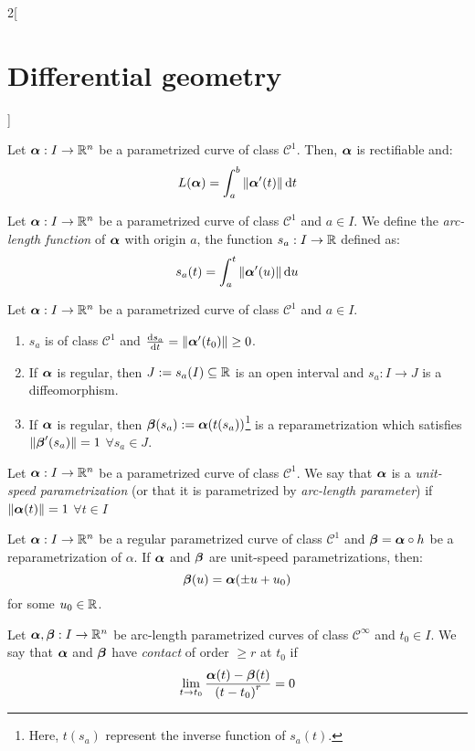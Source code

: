 \documentclass[../../../main.tex]{subfiles}
\begin{document}
\begin{multicols}{2}[\section{Differential geometry}]
\begin{definition}
  \end{definition}
  \begin{proposition}
    Let $\boldsymbol{\mathrm{\alpha}}:I\rightarrow\mathbb{R}^n$ be a parametrized curve of class $\mathcal{C}^1$. Then, $\boldsymbol{\mathrm{\alpha}}$ is rectifiable and: $$L(\boldsymbol{\mathrm{\alpha}})=\int_a^b\|\boldsymbol{\mathrm{\alpha}}'(t)\|\dd{t}$$
  \end{proposition}
  \begin{definition}
    Let $\boldsymbol{\mathrm{\alpha}}:I\rightarrow\mathbb{R}^n$ be a parametrized curve of class $\mathcal{C}^1$ and $a\in I$. We define the \emph{arc-length function} of $\boldsymbol{\mathrm{\alpha}}$ with origin $a$, the function $s_a:I\rightarrow\mathbb{R}$ defined as: $$s_a(t)=\int_a^t\|\boldsymbol{\mathrm{\alpha}}'(u)\|\dd{u}$$
  \end{definition}
  \begin{proposition}
    Let $\boldsymbol{\mathrm{\alpha}}:I\rightarrow\mathbb{R}^n$ be a parametrized curve of class $\mathcal{C}^1$ and $a\in I$.
    \begin{enumerate}
      \item $s_a$ is of class $\mathcal{C}^1$ and $\dv{s_a}{t}(t_0)=\|\boldsymbol{\mathrm{\alpha}}'(t_0)\|\geq 0$.
      \item If $\boldsymbol{\mathrm{\alpha}}$ is regular, then $J:=s_a(I)\subseteq\mathbb{R}$ is an open interval and $s_a:I\rightarrow J$ is a diffeomorphism.
      \item If $\boldsymbol{\mathrm{\alpha}}$ is regular, then $\boldsymbol{\mathrm{\beta}}(s_a):=\boldsymbol{\mathrm{\alpha}}(t(s_a))$\footnote{Here, $t(s_a)$ represent the inverse function of $s_a(t)$.} is a reparametrization which satisfies $\|\boldsymbol{\mathrm{\beta}}'(s_a)\|=1$ $\forall s_a\in J$.
    \end{enumerate}
  \end{proposition}
  \begin{definition}
    Let $\boldsymbol{\mathrm{\alpha}}:I\rightarrow\mathbb{R}^n$ be a parametrized curve of class $\mathcal{C}^1$. We say that $\boldsymbol{\mathrm{\alpha}}$ is a \emph{unit-speed parametrization} (or that it is parametrized by \emph{arc-length parameter}) if $\|\boldsymbol{\mathrm{\alpha}}(t)\|=1$ $\forall t\in I$
  \end{definition}
  \begin{proposition}
    Let $\boldsymbol{\mathrm{\alpha}}:I\rightarrow\mathbb{R}^n$ be a regular parametrized curve of class $\mathcal{C}^1$ and $\boldsymbol{\mathrm{\beta}}=\boldsymbol{\mathrm{\alpha}}\circ h$ be a reparametrization of $\alpha$. If $\boldsymbol{\mathrm{\alpha}}$ and $\boldsymbol{\mathrm{\beta}}$ are unit-speed parametrizations, then: $$\boldsymbol{\mathrm{\beta}}(u)=\boldsymbol{\mathrm{\alpha}}(\pm u+u_0)$$ for some $u_0\in\mathbb{R}$.
  \end{proposition}
  \begin{definition}
    Let $\boldsymbol{\mathrm{\alpha}},\boldsymbol{\mathrm{\beta}}:I\rightarrow\mathbb{R}^n$ be arc-length parametrized curves of class $\mathcal{C}^\infty$ and $t_0\in I$. We say that $\boldsymbol{\mathrm{\alpha}}$ and $\boldsymbol{\mathrm{\beta}}$ have \emph{contact} of order $\geq r$ at $t_0$ if $$\lim_{t\to t_0}\frac{\boldsymbol{\mathrm{\alpha}}(t)-\boldsymbol{\mathrm{\beta}}(t)}{{(t-t_0)}^r}=0$$

\end{definition}
\end{multicols}
\end{document}
